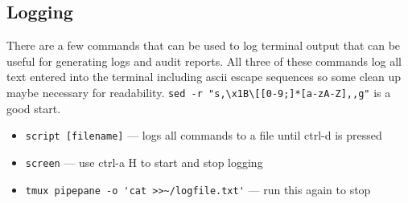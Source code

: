 \subsection{Logging}

There are a few commands that can be used to log terminal output that can be useful for generating logs and audit reports.
All three of these commands log all text entered into the terminal including ascii escape sequences so some clean up maybe necessary for readability.
\mbox{\lstinline|sed -r "s,\x1B\[[0-9;]*[a-zA-Z],,g"|} is a good start.


\begin{itemize}
\item \lstinline|script [filename]| --- logs all commands to a file until ctrl-d is pressed
\item \lstinline|screen| --- use ctrl-a H to start and stop logging
\item \lstinline|tmux pipepane -o 'cat >>~/logfile.txt'| --- run this again to stop
\end{itemize}
